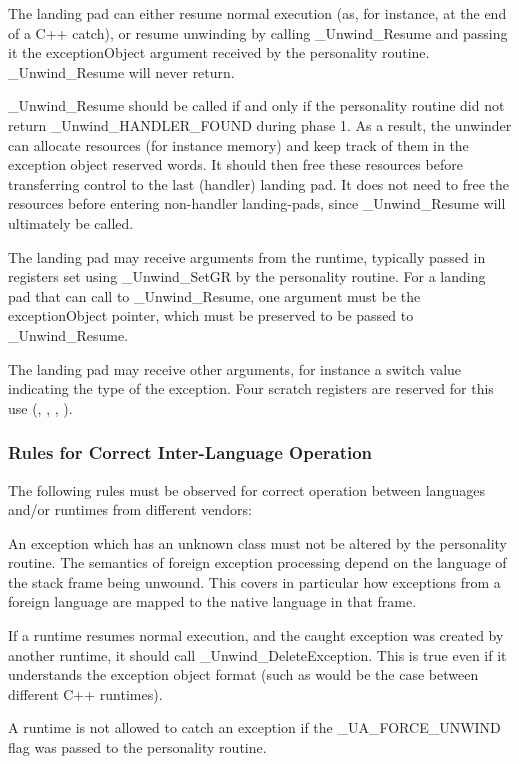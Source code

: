 The landing pad can either resume normal execution (as, for instance, at
the end of a C++ catch), or resume unwinding by calling \_Unwind\_Resume and
passing it the exceptionObject argument received by the personality routine. 
\_Unwind\_Resume will never return. 

\_Unwind\_Resume should be called if and only if the personality routine 
did not return \_Unwind\_HANDLER\_FOUND during phase 1.  As a result, 
the unwinder can allocate resources (for instance memory) and keep track 
of them in the exception object reserved words. It should then free these 
resources before transferring control to the last (handler) landing pad. 
It does not need to free the resources before entering non-handler 
landing-pads, since \_Unwind\_Resume will ultimately be called. 

The landing pad may receive arguments from the runtime, typically passed 
in registers set using \_Unwind\_SetGR by the personality routine. 
For a landing pad that can call to \_Unwind\_Resume, one argument must 
be the exceptionObject pointer, which must be preserved to be passed to 
\_Unwind\_Resume. 

The landing pad may receive other arguments, for instance a switch value 
indicating the type of the exception. Four scratch registers are reserved 
for this use (\RDI, \RSI, \RDX, \RCX). 

\subsubsection{Rules for Correct Inter-Language Operation}

The following rules must be observed for correct operation between
languages and/or runtimes from different vendors:

An exception which has an unknown class must not be altered by the 
personality routine. The semantics of foreign exception processing
depend on the language of the stack frame being unwound. This covers 
in particular how exceptions from a foreign language are mapped to
the native language in that frame. 

If a runtime resumes normal execution, and the caught exception was 
created by another runtime, it should call \_Unwind\_DeleteException. 
This is true even if it understands the exception object format 
(such as would be the case between different C++ runtimes). 

A runtime is not allowed to catch an exception if the 
\_UA\_FORCE\_UNWIND flag was passed to the personality routine. 

